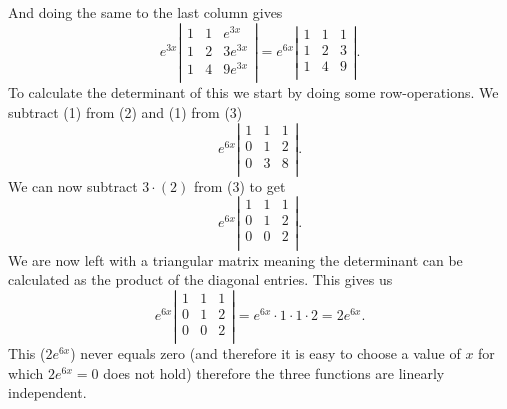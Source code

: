 And doing the same to the last column gives
\[ 
 e^{3x} \left| \begin{array}{ccc}
 1 & 1 & e^{3x}\\
 1 & 2 & 3e^{3x}\\
 1 & 4 & 9e^{3x}\\
 \end{array} \right| = e^{6x} \left| \begin{array}{ccc}
 1 & 1 & 1\\
 1 & 2 & 3\\
 1 & 4 & 9\\
 \end{array} \right|
.\]
To calculate the determinant of this we start by doing some row-operations. We subtract (1) from (2) and (1) from (3)
\[ 
 e^{6x}\left| \begin{array}{ccc}
 1 & 1 & 1\\
 0 & 1 & 2\\
 0 & 3 & 8\\
 \end{array} \right|
.\]
We can now subtract $3\cdot (2)$ from (3) to get
\[ 
  e^{6x} \left| \begin{array}{ccc}
  1 & 1 & 1\\
  0 & 1 & 2\\
  0 & 0 & 2\\
  \end{array} \right|
.\]
We are now left with a triangular matrix meaning the determinant can be calculated as the product of the diagonal entries. This gives us 
\[ 
 e^{6x} \left| \begin{array}{ccc}
 1 & 1 & 1\\
 0 & 1 & 2\\
 0 & 0 & 2\\
 \end{array} \right| = e^{6x} \cdot 1 \cdot 1 \cdot 2 = 2e^{6x}
.\]
This ($2e^{6x}$) never equals zero (and therefore it is easy to choose a value of $x$ for which $2e^{6x} = 0$ does not hold) therefore the three functions are linearly independent. 



